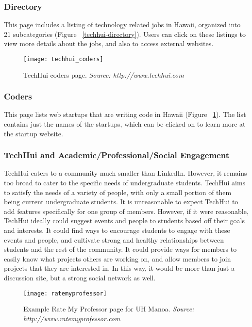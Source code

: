 \subsubsection{Directory}

This page includes a listing of technology related jobs in Hawaii, organized into 21 subcategories (Figure ~\ref{techhui-directory}). Users can click on these listings to view more details about the jobs, and also to access external websites.

\begin{figure}[h]
\centering
\texttt{[image: techhui\_coders]}
\caption{TechHui coders page. \textit{Source: http://www.techhui.com}}
\label{techhui-coders}
\end{figure}

\subsubsection{Coders}

This page lists web startups that are writing code in Hawaii (Figure ~\ref{techhui-coders}). The list contains just the names of the startups, which can be clicked on to learn more at the startup website.

\subsubsection{TechHui and Academic/Professional/Social Engagement}

TechHui caters to a community much smaller than LinkedIn. However, it remains too broad to cater to the specific needs of undergraduate students. TechHui aims to satisfy the needs of a variety of people, with only a small portion of them being current undergraduate students. It is unreasonable to expect TechHui to add features specifically for one group of members. However, if it were reasonable, TechHui ideally could suggest events and people to students based off their goals and interests. It could find ways to encourage students to engage with these events and people, and cultivate strong and healthy relationships between students and the rest of the community. It could provide ways for members to easily know what projects others are working on, and allow members to join projects that they are interested in. In this way, it would be more than just a discussion site, but a strong social network as well. 

\begin{figure}[h]
\centering
\texttt{[image: ratemyprofessor]}
\caption{Example Rate My Professor page for UH Manoa. \textit{Source: http://www.ratemyprofessor.com}}
\label{ratemyprofessor}
\end{figure}

